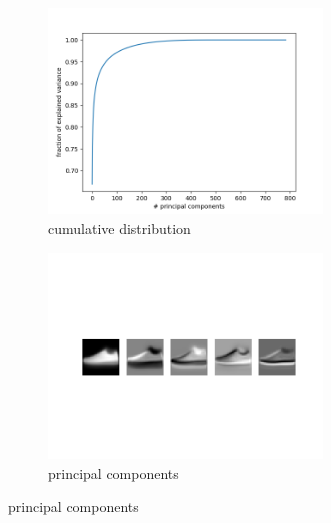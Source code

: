 \documentclass [a4paper, 11pt] {article}
\begin{document}
\begin{enumerate}
\begin{figure}[!h]
	\centering
	\begin{subfigure}{.7\textwidth}
		\centering
		\includegraphics[width=0.8\textwidth]{pca/sneaker/cum_dist.png}
		\caption{cumulative distribution}
		\label{fig:sfig1}
	\end{subfigure}
	\begin{subfigure}{.7\textwidth}
		\centering
		\includegraphics[width=0.8\textwidth]{pca/sneaker/pc.png}
		\caption{principal components}
		\label{fig:sfig2}
	\end{subfigure}
\end{figure}


\end{enumerate}
\end{document}
